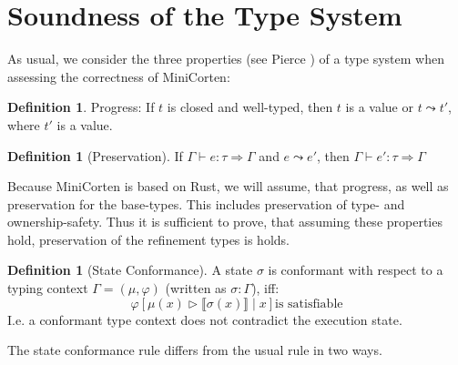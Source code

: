 \documentclass[twoside, english]{sdqthesis}
\newcommand{\bbracket}[1]{\llbracket #1 \rrbracket}
\theoremstyle{definition}
\newtheorem{definition}[theorem]{Definition}
\begin{document}

\section{Soundness of the Type System}

As usual, we consider the three properties (see Pierce \cite[p. 95, p.167]{pierce_types_2002}) of a type system when assessing the correctness of MiniCorten:

\begin{definition}
  Progress:
    If $t$ is closed and well-typed, then $t$ is a value or $t \leadsto t'$, where $t'$ is a value.
\end{definition}

\begin{definition}[Preservation]
  If $\Gamma \vdash e : \tau \Rightarrow \Gamma$ and $e \leadsto e'$, then $\Gamma \vdash e' : \tau \Rightarrow \Gamma$
\end{definition}

Because MiniCorten is based on Rust, we will assume, that progress, as well as preservation for the base-types. This includes preservation of type- and ownership-safety. Thus it is sufficient to prove, that assuming these properties hold, preservation of the refinement types is holds.


\begin{definition}[State Conformance]
  A state $\sigma$ is conformant with respect to a typing context $\Gamma = (\mu, \varphi)$ (written as $\sigma : \Gamma$), iff:
  $$
    \varphi[\mu(x) \triangleright \bbracket{\sigma(x)} \mid x] \text{is satisfiable}
  $$
  I.e. a conformant type context does not contradict the execution state.
\end{definition}

The state conformance rule differs from the usual rule in two ways.
\end{document}
